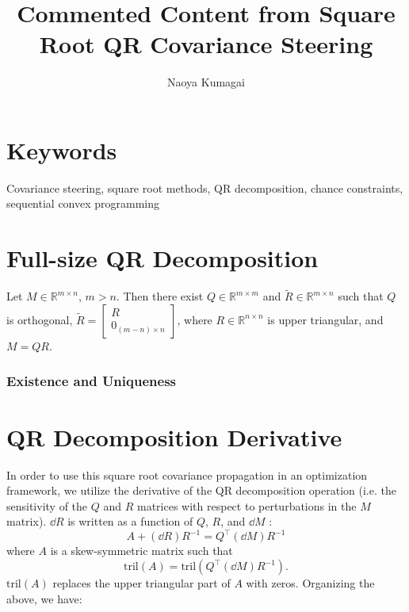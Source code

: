 \documentclass{article}
\title{Commented Content from Square Root QR Covariance Steering}
\author{Naoya Kumagai}
\begin{document}
\maketitle

\section{Keywords}
Covariance steering, square root methods, QR decomposition, chance constraints, sequential convex programming

\section{Full-size QR Decomposition}
\begin{lemma}
	Let \( M \in \mathbb{R}^{m \times n} \), \(m > n\). Then there exist \(Q \in \mathbb{R}^{m \times m}\) and \(\tilde{R} \in \mathbb{R}^{m \times n}\) such that \(Q\) is orthogonal, \( \tilde{R} = \begin{bmatrix}
	R \\ 0_{(m-n) \times n}
	\end{bmatrix}\), where \( R \in \mathbb{R}^{n \times n} \) is upper triangular, and \( M = QR \).
\end{lemma}

\subsubsection{Existence and Uniqueness}

\section{QR Decomposition Derivative}
In order to use this square root covariance propagation in an optimization framework, we utilize the derivative of the QR decomposition operation (i.e. the sensitivity of the $Q$ and $R$ matrices with respect to perturbations in the $M$ matrix). $\dd R$ is written as a function of \(Q\), \( R\), and  $\dd M$ \cite{deleeuwDifferentiatingQRDecomposition2023}:
\begin{equation}
	A + (\dd R) R^{-1} = Q^\top (\dd M) R^{-1}
\end{equation}
where \( A \) is a skew-symmetric matrix such that 
\begin{equation}
	\mathrm{tril}(A) = \mathrm{tril}(Q^\top (\dd M) R^{-1}).
\end{equation}
\( \mathrm{tril}(A) \) replaces the upper triangular part of \( A \) with zeros.
Organizing the above, we have:
\end{document}
